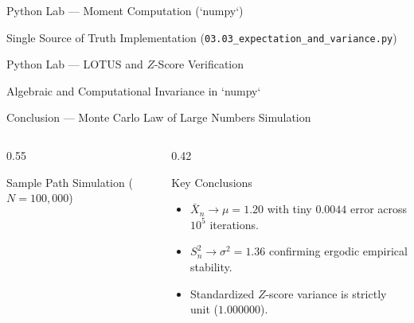 \documentclass[aspectratio=169,xcolor={dvipsnames,table}]{beamer}
\begin{document}
\begin{frame}[fragile]{Python Lab --- Moment Computation (`numpy`)}
	\begin{block}{Single Source of Truth Implementation (\texttt{03.03\_expectation\_and\_variance.py})}
		
	\end{block}
\end{frame}

\begin{frame}[fragile]{Python Lab --- LOTUS and $Z$-Score Verification}
	\begin{block}{Algebraic and Computational Invariance in `numpy`}
		
	\end{block}
\end{frame}

\begin{frame}[fragile]{Conclusion --- Monte Carlo Law of Large Numbers Simulation}
	\begin{columns}[T]
		\begin{column}{0.55\textwidth}
			\begin{block}{Sample Path Simulation ($N=100,000$)}
				
			\end{block}
		\end{column}
		\begin{column}{0.42\textwidth}
			\begin{alertblock}{Key Conclusions}
				\scriptsize
				\begin{itemize}
					\itemsep=0.06cm
					\item $\bar{X}_n \to \mu = 1.20$ with tiny $0.0044$ error across $10^5$ iterations.
					\item $S_n^2 \to \sigma^2 = 1.36$ confirming ergodic empirical stability.
					\item Standardized $Z$-score variance is strictly unit ($1.000000$).
				\end{itemize}
			\end{alertblock}
		\end{column}
	\end{columns}
\end{frame}
\end{document}
